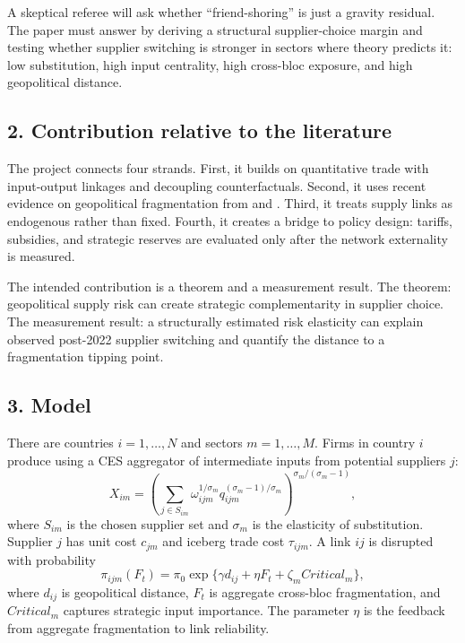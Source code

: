 \documentclass[11pt]{article}
\begin{document}
A skeptical referee will ask whether ``friend-shoring'' is just a gravity residual. The paper must answer by deriving a structural supplier-choice margin and testing whether supplier switching is stronger in sectors where theory predicts it: low substitution, high input centrality, high cross-bloc exposure, and high geopolitical distance.

\subsection*{2. Contribution relative to the literature}
The project connects four strands. First, it builds on quantitative trade with input-output linkages and decoupling counterfactuals. Second, it uses recent evidence on geopolitical fragmentation from \citet{GopinathEtAl2025JIE} and \citet{FernandezVillaverdeMineyamaSong2024}. Third, it treats supply links as endogenous rather than fixed. Fourth, it creates a bridge to policy design: tariffs, subsidies, and strategic reserves are evaluated only after the network externality is measured.

The intended contribution is a theorem and a measurement result. The theorem: geopolitical supply risk can create strategic complementarity in supplier choice. The measurement result: a structurally estimated risk elasticity can explain observed post-2022 supplier switching and quantify the distance to a fragmentation tipping point.

\subsection*{3. Model}
There are countries $i=1,\ldots,N$ and sectors $m=1,\ldots,M$. Firms in country $i$ produce using a CES aggregator of intermediate inputs from potential suppliers $j$:
\begin{equation}
X_{im}=\left(\sum_{j\in S_{im}} \omega_{ijm}^{1/\sigma_m} q_{ijm}^{(\sigma_m-1)/\sigma_m}\right)^{\sigma_m/(\sigma_m-1)},
\end{equation}
where $S_{im}$ is the chosen supplier set and $\sigma_m$ is the elasticity of substitution. Supplier $j$ has unit cost $c_{jm}$ and iceberg trade cost $\tau_{ijm}$. A link $ij$ is disrupted with probability
\begin{equation}
\pi_{ijm}(F_t)=\pi_0\exp\{\gamma d_{ij}+\eta F_t+\zeta_m Critical_m\}, \label{eq:disruption}
\end{equation}
where $d_{ij}$ is geopolitical distance, $F_t$ is aggregate cross-bloc fragmentation, and $Critical_m$ captures strategic input importance. The parameter $\eta$ is the feedback from aggregate fragmentation to link reliability.
\end{document}
